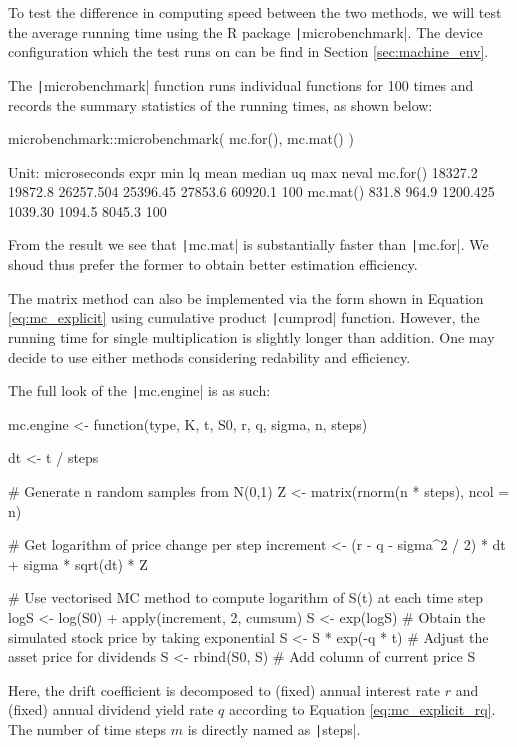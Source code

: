 To test the difference in computing speed between the two methods, we will test the average running time using the R package \texttt|microbenchmark|. The device configuration which the test runs on can be find in Section \ref{sec:machine_env}.

The \texttt|microbenchmark| function runs individual functions for 100 times and records the summary statistics of the running times, as shown below:

\begin{Rminted}
microbenchmark::microbenchmark(
    mc.for(),
    mc.mat()
)

    Unit: microseconds
    expr     min      lq      mean   median      uq     max neval
mc.for() 18327.2 19872.8 26257.504 25396.45 27853.6 60920.1   100
mc.mat()   831.8   964.9  1200.425  1039.30  1094.5  8045.3   100
\end{Rminted}

From the result we see that \texttt|mc.mat| is substantially faster than \texttt|mc.for|. We shoud thus prefer the former to obtain better estimation efficiency.

The matrix method can also be implemented via the form shown in Equation \ref{eq:mc_explicit} using cumulative product \texttt|cumprod| function. However, the running time for single multiplication is slightly longer than addition. One may decide to use either methods considering redability and efficiency.

The full look of the \texttt|mc.engine| is as such:

\begin{Rminted}
    mc.engine <- function(type, K, t, S0, r, q, sigma, n, steps) {

    dt <- t / steps

    # Generate n random samples from N(0,1)
    Z <- matrix(rnorm(n * steps), ncol = n)

    # Get logarithm of price change per step
    increment <- (r - q - sigma^2 / 2) * dt + sigma * sqrt(dt) * Z

    # Use vectorised MC method to compute logarithm of S(t) at each time step
    logS <- log(S0) + apply(increment, 2, cumsum)
    S <- exp(logS) # Obtain the simulated stock price by taking exponential
    S <- S * exp(-q * t) # Adjust the asset price for dividends
    S <- rbind(S0, S) # Add column of current price
    S
}
\end{Rminted}

Here, the drift coefficient is decomposed to (fixed) annual interest rate $r$ and (fixed) annual dividend yield rate $q$ according to Equation \ref{eq:mc_explicit_rq}. The number of time steps $m$ is directly named as \texttt|steps|.

